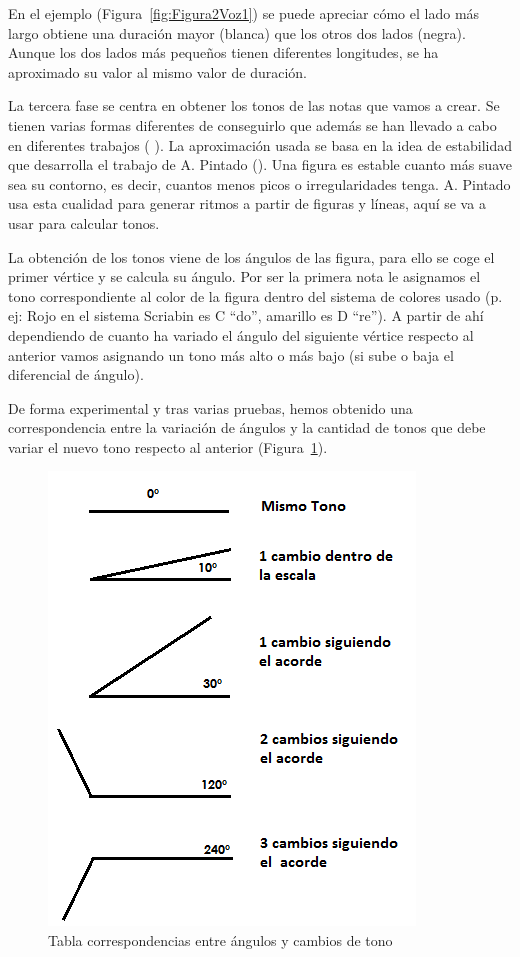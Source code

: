 En el ejemplo (Figura~\ref{fig:Figura2Voz1}) se puede apreciar cómo el lado más largo obtiene una duración mayor (blanca) que los otros dos lados (negra). Aunque los dos lados más pequeños tienen diferentes longitudes, se ha aproximado su valor al mismo valor de duración.

La tercera fase se centra en obtener los tonos de las notas que vamos a crear. Se tienen varias formas diferentes de conseguirlo que además se han llevado a cabo en diferentes trabajos (\cite{bricksConvertsMusic} \cite{ImageBaseComposition}). La aproximación usada se basa en la idea de estabilidad que desarrolla el trabajo de A. Pintado (\cite{portutesis}). Una figura es estable cuanto más suave sea su contorno, es decir, cuantos menos picos o irregularidades tenga. A. Pintado usa esta cualidad para generar ritmos a partir de figuras y líneas, aquí se va a usar para calcular tonos.

La obtención de los tonos viene de los ángulos de las figura, para ello se coge el primer vértice y se calcula su ángulo. Por ser la primera nota le asignamos el tono correspondiente al color de la figura dentro del sistema de colores usado (p. ej: Rojo en el sistema Scriabin es C ``do'', amarillo es D ``re''). A partir de ahí dependiendo de cuanto ha variado el ángulo del siguiente vértice respecto al anterior vamos asignando un tono más alto o más bajo (si sube o baja el diferencial de ángulo).

De forma experimental y tras varias pruebas, hemos obtenido una correspondencia entre la variación de ángulos y la cantidad de tonos que debe variar el nuevo tono respecto al anterior (Figura~\ref{fig:Figura3Voz1}). 

		\begin{figure}[htbp]
		\centering
		\hspace*{0.0in}
		\includegraphics[scale=0.75]{graphics/tabla-corresp-Tono-Angulo.png}
		\caption{Tabla correspondencias entre ángulos y cambios de tono}
		\label{fig:Figura3Voz1}
		\end{figure}

